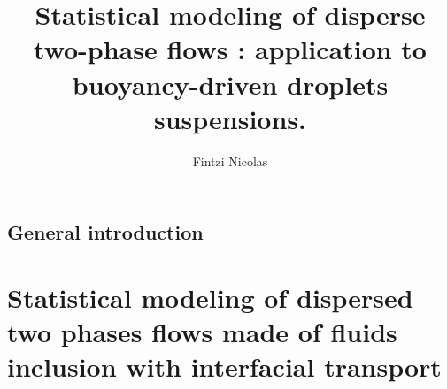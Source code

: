 \documentclass[
    a4paper,                            %
    12pt,                               %
    twoside,                            %
    open=right,                         %
]{My_book}
\title{Statistical modeling of disperse two-phase flows : application to buoyancy-driven droplets suspensions.}
\author{Fintzi Nicolas}
\begin{document}
\dominitoc

\frontmatter
\pagestyle{plain}




\mainmatter

\adjustmtc


\chapter{General introduction}
\label{part:intro}

\minitoc



\part{Statistical modeling of dispersed two phases flows made of fluids inclusion with interfacial transport}
\label{part:one}

\end{document}

